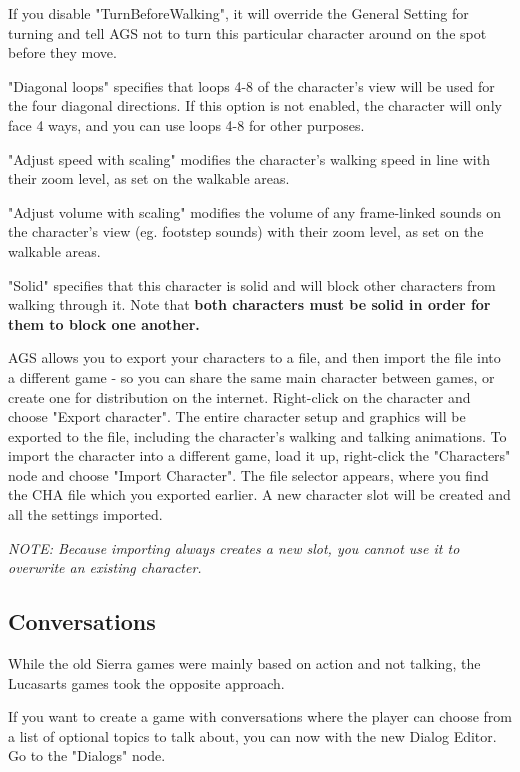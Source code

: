 If you disable "TurnBeforeWalking", it will override the General Setting for
turning and tell AGS not to turn this particular character around on the
spot before they move.

"Diagonal loops" specifies that loops 4-8 of the character's view will be used for
the four diagonal directions. If this option is not enabled, the character will only
face 4 ways, and you can use loops 4-8 for other purposes.

"Adjust speed with scaling" modifies the character's walking speed in line with their
zoom level, as set on the walkable areas.

"Adjust volume with scaling" modifies the volume of any frame-linked sounds on the
character's view (eg. footstep sounds) with their zoom level, as set on the walkable areas.

"Solid" specifies that this character is solid and will block other characters from
walking through it. Note that \bf{both} characters must be solid in order for them
to block one another.

AGS allows you to export your characters to a file, and then import the file into a
different game - so you can share the same main character between games, or
create one for distribution on the internet. Right-click on the character and
choose "Export character". The entire character setup and graphics will be exported
to the file, including the character's walking and talking animations.
To import the character into a different game, load it up, right-click the "Characters"
node and choose "Import Character". The file selector appears, where you find the CHA file which
you exported earlier. A new character slot will be created and all the settings imported.

\it{NOTE: Because importing always creates a new slot, you cannot use it to
overwrite an existing character.}

\subsection{Conversations}%

While the old Sierra games were mainly based on action and not talking, the
Lucasarts games took the opposite approach.

If you want to create a game with conversations where the player can choose
from a list of optional topics to talk about, you can now with the new Dialog
Editor. Go to the "Dialogs" node.

